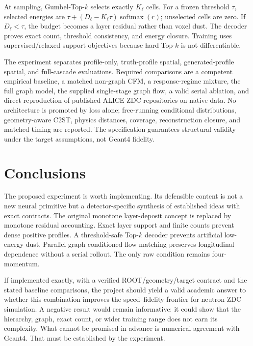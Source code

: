 \documentclass[11pt]{article}
\theoremstyle{definition}
\theoremstyle{remark}
\newcommand{\softmax}{\operatorname{softmax}}
\begin{document}
At sampling, Gumbel-Top-$k$ selects exactly $K_\ell$ cells. For a frozen threshold $\tau$, selected energies are
$\tau+(D_\ell-K_\ell\tau)\softmax(r)$; unselected cells are zero. If $D_\ell<\tau$, the budget becomes a layer residual rather than voxel dust. The decoder proves exact count, threshold consistency, and energy closure. Training uses supervised/relaxed support objectives because hard Top-$k$ is not differentiable.

The experiment separates profile-only, truth-profile spatial, generated-profile spatial, and full-cascade evaluations. Required comparisons are a competent empirical baseline, a matched non-graph CFM, a response-regime mixture, the full graph model, the supplied single-stage graph flow, a valid serial ablation, and direct reproduction of published ALICE ZDC repositories on native data. No architecture is promoted by loss alone; free-running conditional distributions, geometry-aware C2ST, physics distances, coverage, reconstruction closure, and matched timing are reported. The specification guarantees structural validity under the target assumptions, not Geant4 fidelity.

\section{Conclusions}
The proposed experiment is worth implementing. Its defensible content is not a new neural primitive but a detector-specific synthesis of established ideas with exact contracts. The original monotone layer-deposit concept is replaced by monotone residual accounting. Exact layer support and finite counts prevent dense positive profiles. A threshold-safe Top-$k$ decoder prevents artificial low-energy dust. Parallel graph-conditioned flow matching preserves longitudinal dependence without a serial rollout. The only raw condition remains four-momentum.

If implemented exactly, with a verified ROOT/geometry/target contract and the stated baseline comparisons, the project should yield a valid academic answer to whether this combination improves the speed--fidelity frontier for neutron ZDC simulation. A negative result would remain informative: it could show that the hierarchy, graph, exact count, or wider training range does not earn its complexity. What cannot be promised in advance is numerical agreement with Geant4. That must be established by the experiment.

\appendix
\end{document}
